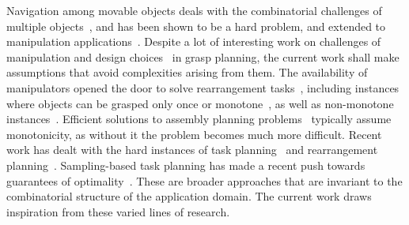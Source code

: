 Navigation among movable objects deals with the combinatorial challenges of multiple objects~\cite{wilfong1991motion,van2009path}, and has been shown to be a hard problem, and extended to manipulation applications~\cite{stilman2007manipulation}. Despite a lot of interesting work on challenges of manipulation and design choices~\cite{littlefield2016evaluating} in grasp planning, the current work shall make assumptions that avoid complexities arising from them. The availability of manipulators opened the door to solve rearrangement tasks~\cite{ben1998practical,ota2004rearrangement}, including instances where objects can be grasped only once or monotone~\cite{stilman2007manipulation}, as well as non-monotone instances~\cite{havur2014geometric,srivastava2014combined}. Efficient solutions to assembly planning problems~\cite{Wilson:1994fk,Halperin:2000uq} typically assume monotonicity, as without it the problem becomes much more difficult. Recent work has dealt with the hard instances of task planning~\cite{berenson2011task,cohen2014single} and rearrangement planning~\cite{krontiris2015dealing,krontiris2016efficiently,193}. Sampling-based task planning has made a recent push towards guarantees of optimality~\cite{vega2016asymptotically,schmitt2017optimal}. These are broader approaches that are invariant to the combinatorial structure of the application domain. The current work draws inspiration from these varied lines of research.


